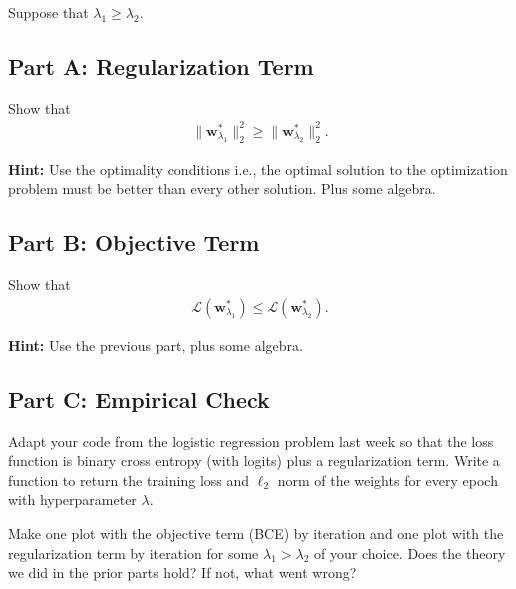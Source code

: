 \documentclass{article}
\begin{document}
Suppose that $\lambda_1 \geq \lambda_2$.

\subsection*{Part A: Regularization Term}

Show that
\begin{align}
    \| \mathbf{w}^*_{\lambda_1} \|_2^2 \geq
    \| \mathbf{w}^*_{\lambda_2} \|_2^2.
\end{align}

\textbf{Hint:} Use the optimality conditions i.e., the optimal solution to the optimization problem must be better than every other solution. Plus some algebra.


\subsection*{Part B: Objective Term}

Show that
\begin{align}
    \mathcal{L}(\mathbf{w}^*_{\lambda_1}) \leq
    \mathcal{L}(\mathbf{w}^*_{\lambda_2}).
\end{align}

\textbf{Hint:} Use the previous part, plus some algebra.

\subsection*{Part C: Empirical Check}

Adapt your code from the logistic regression problem last week so that the loss function is binary cross entropy (with logits) plus a regularization term.
Write a function to return the training loss and $\ell_2$ norm of the weights for every epoch with hyperparameter $\lambda$.

Make one plot with the objective term (BCE) by iteration and one plot with the regularization term by iteration for some $\lambda_1 > \lambda_2$ of your choice.
Does the theory we did in the prior parts hold?
If not, what went wrong?

%
\end{document}
